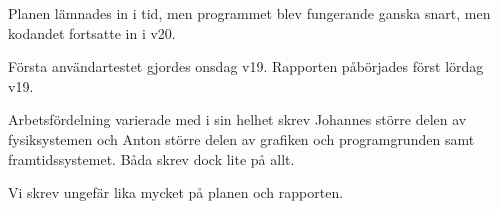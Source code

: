 Planen lämnades in i tid, men programmet blev fungerande ganska snart,
men kodandet fortsatte in i v20.

Första användartestet gjordes onsdag v19.
Rapporten påbörjades först lördag v19.


Arbetsfördelning varierade med i sin helhet skrev Johannes större
delen av fysiksystemen och
Anton större delen av grafiken och programgrunden samt framtidssystemet.
Båda skrev dock lite på allt.

Vi skrev ungefär lika mycket på planen och rapporten.

